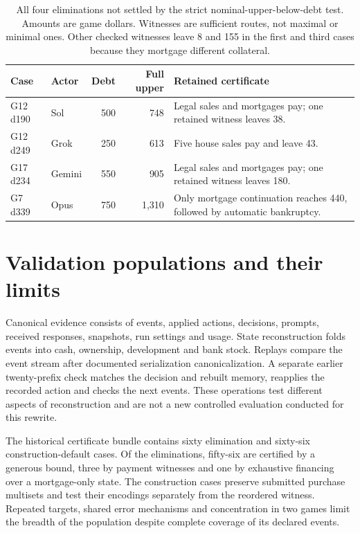\begin{table}[htbp]
\centering\small
\begin{tabularx}{\linewidth}{@{}llrrY@{}}
\toprule
Case & Actor & Debt & Full upper & Retained certificate\\
\midrule
G12 d190 & Sol & 500 & 748 & Legal sales and mortgages pay; one retained witness leaves 38.\\
G12 d249 & Grok & 250 & 613 & Five house sales pay and leave 43.\\
G17 d234 & Gemini & 550 & 905 & Legal sales and mortgages pay; one retained witness leaves 180.\\
G7 d339 & Opus & 750 & 1,310 & Only mortgage continuation reaches 440, followed by automatic bankruptcy.\\
\bottomrule
\end{tabularx}
\caption{All four eliminations not settled by the strict nominal-upper-below-debt test. Amounts are game dollars. Witnesses are sufficient routes, not maximal or minimal ones. Other checked witnesses leave 8 and 155 in the first and third cases because they mortgage different collateral.}
\end{table}

\section{Validation populations and their limits}
\label{app:validation}

Canonical evidence consists of events, applied actions, decisions, prompts, received responses, snapshots, run settings and usage. State reconstruction folds events into cash, ownership, development and bank stock. Replays compare the event stream after documented serialization canonicalization. A separate earlier twenty-prefix check matches the decision and rebuilt memory, reapplies the recorded action and checks the next events. These operations test different aspects of reconstruction and are not a new controlled evaluation conducted for this rewrite.

The historical certificate bundle contains sixty elimination and sixty-six construction-default cases. Of the eliminations, fifty-six are certified by a generous bound, three by payment witnesses and one by exhaustive financing over a mortgage-only state. The construction cases preserve submitted purchase multisets and test their encodings separately from the reordered witness. Repeated targets, shared error mechanisms and concentration in two games limit the breadth of the population despite complete coverage of its declared events.

